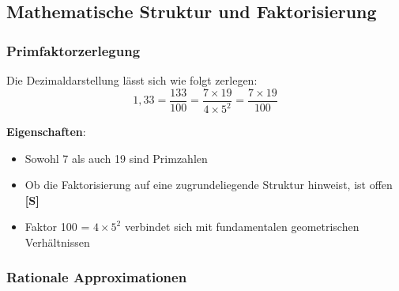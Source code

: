 	\subsection{Mathematische Struktur und Faktorisierung}
	\label{subsec:mathematische_struktur}
	
	\subsubsection{Primfaktorzerlegung}
	\label{subsubsec:primfaktorzerlegung}
	
	Die Dezimaldarstellung lässt sich wie folgt zerlegen:
	\begin{equation}
		1{,}33 = \frac{133}{100} = \frac{7 \times 19}{4 \times 5^2} = \frac{7 \times 19}{100}
		\label{eq:faktorisierung}
	\end{equation}
	
	\textbf{Eigenschaften}:
	\begin{itemize}
		\item Sowohl 7 als auch 19 sind Primzahlen
		\item Ob die Faktorisierung auf eine zugrundeliegende Struktur hinweist, ist offen \textbf{[S]}
		\item Faktor 100 = $4 \times 5^2$ verbindet sich mit fundamentalen geometrischen Verhältnissen
	\end{itemize}
	
	\subsubsection{Rationale Approximationen}
	\label{subsubsec:rationale_approximationen}
	
	\begin{table}[htbp]
		\centering
		\caption{Rationale Approximationen des $\xi$ Koeffizienten}
		\label{tab:rationale_approximationen}
	\end{table}
	
